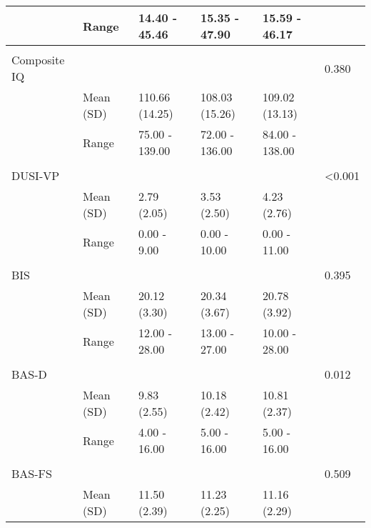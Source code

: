 \documentclass{article}
\begin{document}
\begin{table}[h!]
\begin{tabular}{llllll}
                    & Range           & 14.40 - 45.46  & 15.35 - 47.90  & 15.59 - 46.17  &                          \\ \hline \\
Composite IQ        &                 &                  &                  &                  & 0.380                    \\
                    & Mean (SD)       & 110.66 (14.25) & 108.03 (15.26) & 109.02 (13.13) &                          \\
                    & Range           & 75.00 - 139.00 & 72.00 - 136.00 & 84.00 - 138.00 &                          \\ \hline \\
DUSI-VP    &                 &                  &                  &                  & \textless 0.001 \\
                    & Mean (SD)       & 2.79 (2.05)    & 3.53 (2.50)    & 4.23 (2.76)    &                          \\
                    & Range           & 0.00 - 9.00    & 0.00 - 10.00   & 0.00 - 11.00   &                          \\ \hline \\
BIS                 &                 &                  &                  &                  & 0.395                    \\
                    & Mean (SD)       & 20.12 (3.30)   & 20.34 (3.67)   & 20.78 (3.92)   &                          \\
                    & Range           & 12.00 - 28.00  & 13.00 - 27.00  & 10.00 - 28.00  &                          \\ \hline \\
BAS-D &                 &                  &                  &                  & 0.012           \\
                    & Mean (SD)       & 9.83 (2.55)    & 10.18 (2.42)   & 10.81 (2.37)   &                          \\
                    & Range           & 4.00 - 16.00   & 5.00 - 16.00   & 5.00 - 16.00   &                          \\ \hline \\
BAS-FS     &                 &                  &                  &                  & 0.509                    \\
                    & Mean (SD)       & 11.50 (2.39)   & 11.23 (2.25)   & 11.16 (2.29)   &                          \\

\end{tabular}
\end{table}
\end{document}
